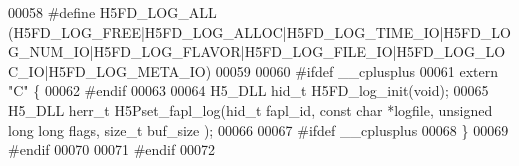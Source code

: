 \begin{DoxyCode}
00058 \textcolor{preprocessor}{#define H5FD\_LOG\_ALL       
       (H5FD\_LOG\_FREE|H5FD\_LOG\_ALLOC|H5FD\_LOG\_TIME\_IO|H5FD\_LOG\_NUM\_IO|H5FD\_LOG\_FLAVOR|H5FD\_LOG\_FILE\_IO|H5FD\_LOG\_LOC\_IO|H5FD\_LOG\_META\_IO)}
00059 
00060 \textcolor{preprocessor}{#ifdef \_\_cplusplus}
00061 \textcolor{keyword}{extern} \textcolor{stringliteral}{"C"} \{
00062 \textcolor{preprocessor}{#endif}
00063 
00064 H5\_DLL hid\_t H5FD\_log\_init(\textcolor{keywordtype}{void});
00065 H5\_DLL herr\_t H5Pset\_fapl\_log(hid\_t fapl\_id, \textcolor{keyword}{const} \textcolor{keywordtype}{char} *logfile, \textcolor{keywordtype}{unsigned} \textcolor{keywordtype}{long} \textcolor{keywordtype}{long} flags, \textcolor{keywordtype}{size\_t} buf\_size
      );
00066 
00067 \textcolor{preprocessor}{#ifdef \_\_cplusplus}
00068 \}
00069 \textcolor{preprocessor}{#endif}
00070 
00071 \textcolor{preprocessor}{#endif}
00072 
\end{DoxyCode}
